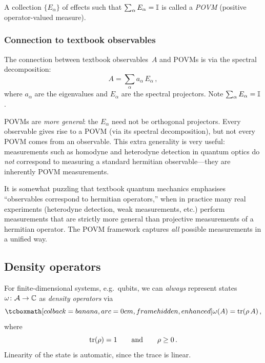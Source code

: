 \begin{definition}[POVM]\label{def:povm}
  A collection $\{E_\alpha\}$ of effects such that $\sum_\alpha E_\alpha
  = \mathbb{I}$ is called a \emph{POVM} (positive operator-valued measure).
\end{definition}

\subsubsection{Connection to textbook observables}
The connection between textbook observables~$A$ and POVMs is via the
spectral decomposition:
\begin{equation}\label{eq:spectral}
  A = \sum_\alpha a_\alpha\, E_\alpha\,,
\end{equation}
where $a_\alpha$ are the eigenvalues and $E_\alpha$ are the spectral
projectors.  Note $\sum_\alpha E_\alpha = \mathbb{I}$.

POVMs are \emph{more general}: the $E_\alpha$ need not be orthogonal
projectors.  Every observable gives rise to a POVM (via its spectral
decomposition), but not every POVM comes from an observable.  This extra
generality is very useful: measurements such as homodyne and heterodyne
detection in quantum optics do \emph{not} correspond to measuring a
standard hermitian observable---they are inherently POVM measurements.

\begin{intuition}
  It is somewhat puzzling that textbook quantum mechanics emphasises
  ``observables correspond to hermitian operators,'' when in practice
  many real experiments (heterodyne detection, weak measurements, etc.)
  perform measurements that are strictly more general than projective
  measurements of a hermitian operator.  The POVM framework captures
  \emph{all} possible measurements in a unified way.
\end{intuition}

\subsection{Density operators}\label{sec:density-ops}

For finite-dimensional systems, e.g.\ qubits, we can \emph{always}
represent states $\omega\colon \mathcal{A} \to \mathbb{C}$ as \emph{density operators}
via
\begin{equation}\label{eq:density-op}
  \eqbox{\omega(A) = \tr(\rho\, A)}\,,
\end{equation}
where
\begin{equation}\label{eq:density-props}
  \operatorname{tr}(\rho) = 1 \qquad\text{and}\qquad \rho \geq 0\,.
\end{equation}
Linearity of the state is automatic, since the trace is linear.

